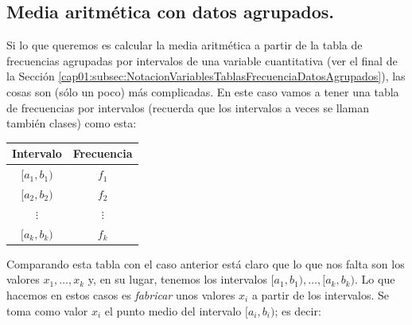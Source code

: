     \subsection{Media aritmética con datos agrupados.}
    \label{cap02:subsec:MediaAritmeticaConDatosAgrupados}

    Si lo que queremos es calcular la media aritmética a partir de la tabla de frecuencias agrupadas por intervalos de una variable cuantitativa (ver el final de la Sección \ref{cap01:subsec:NotacionVariablesTablasFrecuenciaDatosAgrupados}), las cosas son (sólo un poco)  más complicadas. En este caso vamos a tener una tabla de frecuencias por intervalos (recuerda que los intervalos a veces se llaman también {\sf clases}) como esta:
        \begin{center}
        \begin{tabular}{|c|c|}
        \hline
        \rule{0cm}{4mm}{\bf Intervalo}&{\bf Frecuencia}\\ \hline
        \rule{0cm}{4mm}$[a_1,b_1)$&$f_1$\\[2mm] \hline
        \rule{0cm}{4mm}$[a_2,b_2)$&$f_2$\\[2mm] \hline
        $\vdots$&$\vdots$\\[2mm] \hline
        \rule{0cm}{4mm}$[a_k,b_k)$&$f_k$\\[2mm] \hline
        \end{tabular}
        \end{center}
        Comparando esta tabla con el caso anterior está claro que lo que nos falta son los valores $x_1,\ldots,x_k$ y, en su lugar, tenemos los intervalos $[a_1,b_1),\ldots,[a_k,b_k)$. Lo que hacemos en estos casos es {\em fabricar} unos valores $x_i$ a partir de los intervalos. Se toma como valor $x_i$ el punto medio del intervalo $[a_i,b_i)$; es decir:
        \begin{center}
        \end{center}
